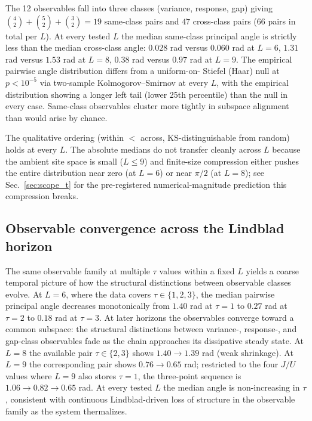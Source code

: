 \documentclass[aps,prresearch,reprint,amsmath,amssymb,longbibliography,floatfix]{revtex4-2}
\begin{document}
The 12 observables fall into three classes (variance, response, gap)
giving $\binom{4}{2}+\binom{5}{2}+\binom{3}{2}=19$ same-class pairs and
$47$ cross-class pairs (66 pairs in total per $L$).
At every tested $L$ the median same-class principal angle is strictly
less than the median cross-class angle:
$0.028$ rad versus $0.060$ rad at $L=6$,
$1.31$ rad versus $1.53$ rad at $L=8$,
$0.38$ rad versus $0.97$ rad at $L=9$.
The empirical pairwise angle distribution differs from a uniform-on-
Stiefel (Haar) null at $p < 10^{-5}$ via two-sample Kolmogorov--Smirnov
at every $L$, with the empirical distribution showing a longer left
tail (lower 25th percentile) than the null in every case.
Same-class observables cluster more tightly in subspace alignment than
would arise by chance.

The qualitative ordering (within $<$ across, KS-distinguishable from
random) holds at every $L$.
The absolute medians do not transfer cleanly across $L$ because the
ambient site space is small ($L\leq 9$) and finite-size compression
either pushes the entire distribution near zero (at $L=6$) or near
$\pi/2$ (at $L=8$); see Sec.~\ref{sec:scope_t} for the
pre-registered numerical-magnitude prediction this compression breaks.

\subsection{Observable convergence across the Lindblad horizon}
\label{sec:t4}

The same observable family at multiple $\tau$ values within a fixed $L$
yields a coarse temporal picture of how the structural distinctions
between observable classes evolve.
At $L=6$, where the data covers $\tau\in\{1,2,3\}$, the median pairwise
principal angle decreases monotonically from $1.40$ rad at $\tau=1$ to
$0.27$ rad at $\tau=2$ to $0.18$ rad at $\tau=3$.
At later horizons the observables converge toward a common subspace:
the structural distinctions between variance-, response-, and gap-class
observables fade as the chain approaches its dissipative steady state.
At $L=8$ the available pair $\tau\in\{2,3\}$ shows $1.40\to 1.39$ rad
(weak shrinkage).
At $L=9$ the corresponding pair shows $0.76\to 0.65$ rad; restricted to
the four $J/U$ values where $L=9$ also stores $\tau=1$, the three-point
sequence is $1.06\to 0.82\to 0.65$ rad.
At every tested $L$ the median angle is non-increasing in $\tau$,
consistent with continuous Lindblad-driven loss of structure in the
observable family as the system thermalizes.
\end{document}
